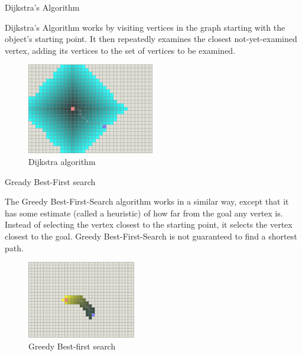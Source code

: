 \documentclass[ignorenonframetext,]{beamer}
\begin{document}
\begin{frame}{Dijkstra's Algorithm}
\protect\hypertarget{dijkstras-algorithm}{}

Dijkstra's Algorithm works by visiting vertices in the graph starting
with the object's starting point. It then repeatedly examines the
closest not-yet-examined vertex, adding its vertices to the set of
vertices to be examined.

\begin{figure}
\centering
\includegraphics[width=\textwidth,height=1.5625in]{dijkstra.png}
\caption{Dijkstra algorithm}
\end{figure}

\end{frame}

\begin{frame}{Gready Best-First search}
\protect\hypertarget{gready-best-first-search}{}

The Greedy Best-First-Search algorithm works in a similar way, except
that it has some estimate (called a heuristic) of how far from the goal
any vertex is. Instead of selecting the vertex closest to the starting
point, it selects the vertex closest to the goal. Greedy
Best-First-Search is not guaranteed to find a shortest path.

\begin{figure}
\centering
\includegraphics[width=\textwidth,height=1.33333in]{best-first-search.png}
\caption{Greedy Best-first search}
\end{figure}

\end{frame}
\end{document}
